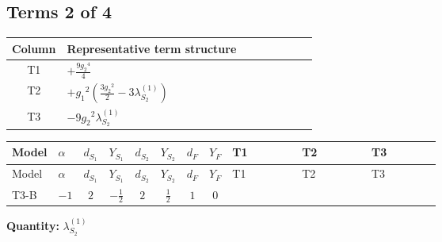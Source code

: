 \documentclass[8pt]{article}
\begin{document}
\begin{landscape}
\subsection*{Terms 2 of 4}
\begin{center}
\begin{tabular}{@{}c >{\raggedright\arraybackslash}p{0.82\linewidth}@{}}
\toprule
Column & Representative term structure \\
\midrule
T1 & \(\displaystyle +\frac{9 {g_2}^4}{4}\) \\
\midrule
T2 & \(\displaystyle +{g_1}^2 \left(\frac{3 {g_2}^2}{2}-3 {\lambda_{S_2}^{(1)}}\right)\) \\
\midrule
T3 & \(\displaystyle -9 {g_2}^2 {\lambda_{S_2}^{(1)}}\) \\
\midrule
\bottomrule
\end{tabular}
\end{center}
\smallskip
\tiny
\begin{longtable}{@{}llcccccc >{\raggedright\arraybackslash}p{0.21\linewidth} >{\raggedright\arraybackslash}p{0.21\linewidth} >{\raggedright\arraybackslash}p{0.21\linewidth}@{}}
\toprule
Model & $\alpha$ & $d_{S_1}$ & $Y_{S_1}$ & $d_{S_2}$ & $Y_{S_2}$ & $d_F$ & $Y_F$ & T1 & T2 & T3 \\
\midrule
\endfirsthead
\toprule
Model & $\alpha$ & $d_{S_1}$ & $Y_{S_1}$ & $d_{S_2}$ & $Y_{S_2}$ & $d_F$ & $Y_F$ & T1 & T2 & T3 \\
\midrule
\endhead
T3-B & $-1$ & $2$ & $-\frac{1}{2}$ & $2$ & $\frac{1}{2}$ & $1$ & $0$ & \scriptsize\adjustbox{max width=\linewidth}{$\begin{gathered} +\frac{9 {g_2}^4}{4}\end{gathered}$} & \scriptsize\adjustbox{max width=\linewidth}{$\begin{gathered} +{g_1}^2 \left(\frac{3 {g_2}^2}{2}-3 {\lambda_{S_2}^{(1)}}\right)\end{gathered}$} & \scriptsize\adjustbox{max width=\linewidth}{$\begin{gathered} -9 {g_2}^2 {\lambda_{S_2}^{(1)}}\end{gathered}$} \\
\midrule
\bottomrule
\end{longtable}
\clearpage
\noindent\textbf{Quantity: }$\lambda_{S_2}^{(1)}$\par\smallskip

\end{landscape}
\end{document}

